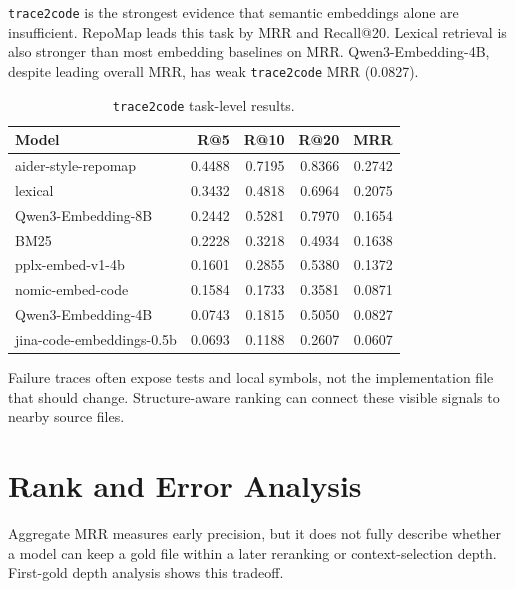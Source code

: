 \documentclass[11pt]{article}
\newcommand{\code}[1]{\texttt{#1}}
\begin{document}
\code{trace2code} is the strongest evidence that semantic embeddings alone are insufficient. RepoMap leads this task by MRR and Recall@20. Lexical retrieval is also stronger than most embedding baselines on MRR. Qwen3-Embedding-4B, despite leading overall MRR, has weak \code{trace2code} MRR (0.0827).

\begin{table}[t]
\centering
\caption{\code{trace2code} task-level results.}
\label{tab:trace2code}
\begin{tabular}{lrrrr}
\toprule
Model & R@5 & R@10 & R@20 & MRR \\
\midrule
aider-style-repomap & 0.4488 & 0.7195 & 0.8366 & 0.2742 \\
lexical & 0.3432 & 0.4818 & 0.6964 & 0.2075 \\
Qwen3-Embedding-8B & 0.2442 & 0.5281 & 0.7970 & 0.1654 \\
BM25 & 0.2228 & 0.3218 & 0.4934 & 0.1638 \\
pplx-embed-v1-4b & 0.1601 & 0.2855 & 0.5380 & 0.1372 \\
nomic-embed-code & 0.1584 & 0.1733 & 0.3581 & 0.0871 \\
Qwen3-Embedding-4B & 0.0743 & 0.1815 & 0.5050 & 0.0827 \\
jina-code-embeddings-0.5b & 0.0693 & 0.1188 & 0.2607 & 0.0607 \\
\bottomrule
\end{tabular}
\end{table}

Failure traces often expose tests and local symbols, not the implementation file that should change. Structure-aware ranking can connect these visible signals to nearby source files.

\section{Rank and Error Analysis}

Aggregate MRR measures early precision, but it does not fully describe whether a model can keep a gold file within a later reranking or context-selection depth. First-gold depth analysis shows this tradeoff.
\end{document}
